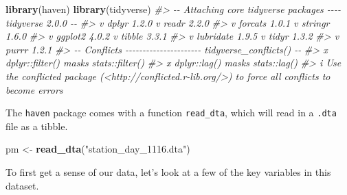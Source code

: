 \documentclass[
]{book}
\newenvironment{Shaded}{\begin{snugshade}}{\end{snugshade}}
\newcommand{\CommentTok}[1]{\textcolor[rgb]{0.56,0.35,0.01}{\textit{#1}}}
\newcommand{\FunctionTok}[1]{\textcolor[rgb]{0.13,0.29,0.53}{\textbf{#1}}}
\newcommand{\NormalTok}[1]{#1}
\newcommand{\OtherTok}[1]{\textcolor[rgb]{0.56,0.35,0.01}{#1}}
\newcommand{\StringTok}[1]{\textcolor[rgb]{0.31,0.60,0.02}{#1}}
\begin{document}
\begin{Shaded}
\begin{Highlighting}[]
\FunctionTok{library}\NormalTok{(haven)}
\FunctionTok{library}\NormalTok{(tidyverse)}
\CommentTok{\#\textgreater{} {-}{-} Attaching core tidyverse packages {-}{-}{-}{-} tidyverse 2.0.0 {-}{-}}
\CommentTok{\#\textgreater{} v dplyr     1.2.0     v readr     2.2.0}
\CommentTok{\#\textgreater{} v forcats   1.0.1     v stringr   1.6.0}
\CommentTok{\#\textgreater{} v ggplot2   4.0.2     v tibble    3.3.1}
\CommentTok{\#\textgreater{} v lubridate 1.9.5     v tidyr     1.3.2}
\CommentTok{\#\textgreater{} v purrr     1.2.1     }
\CommentTok{\#\textgreater{} {-}{-} Conflicts {-}{-}{-}{-}{-}{-}{-}{-}{-}{-}{-}{-}{-}{-}{-}{-}{-}{-}{-}{-}{-}{-} tidyverse\_conflicts() {-}{-}}
\CommentTok{\#\textgreater{} x dplyr::filter() masks stats::filter()}
\CommentTok{\#\textgreater{} x dplyr::lag()    masks stats::lag()}
\CommentTok{\#\textgreater{} i Use the conflicted package (\textless{}http://conflicted.r{-}lib.org/\textgreater{}) to force all conflicts to become errors}
\end{Highlighting}
\end{Shaded}

The \texttt{haven} package comes with a function \texttt{read\_dta}, which will read in a \texttt{.dta} file as a tibble.

\begin{Shaded}
\begin{Highlighting}[]
\NormalTok{pm }\OtherTok{\textless{}{-}} \FunctionTok{read\_dta}\NormalTok{(}\StringTok{"station\_day\_1116.dta"}\NormalTok{)}
\end{Highlighting}
\end{Shaded}

To first get a sense of our data, let's look at a few of the key variables in this dataset.
\end{document}
